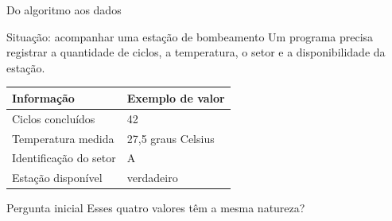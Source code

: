 \begin{frame}{Do algoritmo aos dados}
\begin{block}{Situação: acompanhar uma estação de bombeamento}
Um programa precisa registrar a quantidade de ciclos, a temperatura, o setor e a disponibilidade da estação.
\end{block}
\centering
\begin{tabular}{ll}
\toprule
Informação & Exemplo de valor \\
\midrule
Ciclos concluídos & 42 \\
Temperatura medida & 27,5 graus Celsius \\
Identificação do setor & A \\
Estação disponível & verdadeiro \\
\bottomrule
\end{tabular}
\medskip
\begin{alertblock}{Pergunta inicial}
Esses quatro valores têm a mesma natureza?
\end{alertblock}
\end{frame}
